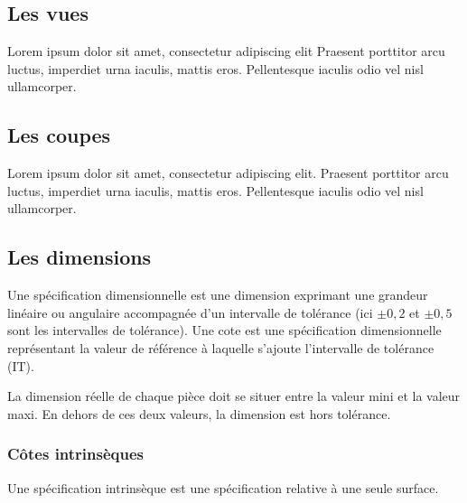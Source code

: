 \documentclass[
	11pt, %
	fleqn, %
	a4paper, %
]{LegrandOrangeBook}
\begin{document}
\subsection{Les vues}
Lorem ipsum dolor sit amet, consectetur adipiscing elit Praesent porttitor arcu luctus, imperdiet urna iaculis, mattis eros. Pellentesque iaculis odio vel nisl ullamcorper.
\subsection{Les coupes}
Lorem ipsum dolor sit amet, consectetur adipiscing elit. Praesent porttitor arcu luctus, imperdiet urna iaculis, mattis eros. Pellentesque iaculis odio vel nisl ullamcorper.
\subsection{Les dimensions}
\begin{center}
\end{center}

Une {\color{blue} spécification dimensionnelle} est une dimension exprimant une grandeur linéaire ou angulaire accompagnée d’un {\color{red}intervalle de tolérance} (ici $\pm 0,2$ et $\pm 0,5$ sont les intervalles de tolérance). Une {\color{red} cote} est une spécification dimensionnelle représentant la valeur de référence à laquelle s’ajoute l’intervalle de tolérance (IT).

  
La dimension réelle de chaque pièce doit se situer entre la valeur mini et la valeur maxi. En dehors de ces deux valeurs, la dimension est hors tolérance. 
\subsubsection{Côtes intrinsèques}
Une spécification intrinsèque est une spécification relative à une seule surface.
\end{document}

